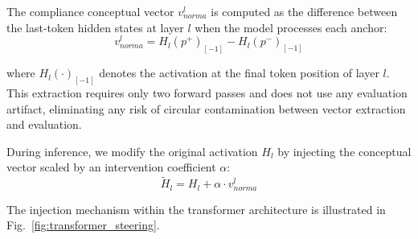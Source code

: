 \documentclass{ieeeaccess}
\begin{document}
The compliance conceptual vector $v_{norma}^l$ is computed as the difference between the last-token hidden states at layer $l$ when the model processes each anchor:
\begin{equation}
v_{norma}^l = H_l(p^+)_{[-1]} - H_l(p^-)_{[-1]}
\label{eq:steering_vector}
\end{equation}

where $H_l(\cdot)_{[-1]}$ denotes the activation at the final token position of layer $l$. This extraction requires only two forward passes and does not use any evaluation artifact, eliminating any risk of circular contamination between vector extraction and evaluation.

During inference, we modify the original activation $H_l$ by injecting the conceptual vector scaled by an intervention coefficient $\alpha$:
\begin{equation}
\tilde{H}_l = H_l + \alpha \cdot v_{norma}^l
\label{eq:steering_injection}
\end{equation}

The injection mechanism within the transformer architecture is illustrated in Fig.~\ref{fig:transformer_steering}.
\end{document}
